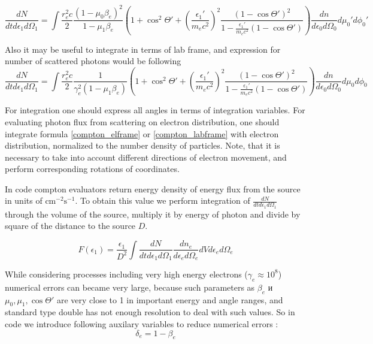 \begin{equation} \label{compton_elframe}
	\frac{dN}{dt d\epsilon_1 d\Omega_1}=\int \frac{r_e^2 c}{2} \frac{(1 - \mu_0 \beta_e)^2}{1-\mu_1\beta_e} \left(1 + \cos^2\Theta'+\left(\frac{\epsilon_1'}{m_e c^2}\right)^2\frac{(1-\cos\Theta')^2}{1-\frac{\epsilon_1'}{m_e c^2}(1 - \cos \Theta')}\right)\frac{dn}{d\epsilon_0 d\Omega_0}d\mu_0' d\phi_0'	
\end{equation}

Also it may be useful to integrate in terms of lab frame, and expression for number of scattered photons would be following
\begin{equation}\label{compton_labframe}
	\frac{dN}{dt d\epsilon_1 d\Omega_1}=\int \frac{r_e^2 c}{2} \frac{1}{\gamma_e^2(1-\mu_1\beta_e)} \left(1 + \cos^2\Theta'+\left(\frac{\epsilon_1'}{m_e c^2}\right)^2\frac{(1-\cos\Theta')^2}{1-\frac{\epsilon_1'}{m_e c^2}(1 - \cos \Theta')}\right)\frac{dn}{d\epsilon_0 d\Omega_0}d\mu_0 d\phi_0
\end{equation}

For integration one should express all angles in terms of integration variables. For evaluating photon flux from scattering on electron distribution, one should integrate formula \ref{compton_elframe} or \ref{compton_labframe} with electron distribution, normalized to the number density of particles. Note, that it is necessary to take into account different directions of electron movement, and perform corresponding rotations of coordinates.

In code compton evaluators return energy density of energy flux from the source in units of $\text{cm}^{-2} \text{s}^{-1}$. To obtain this value we perform integration of $\frac{dN}{dt d\epsilon_1 d\Omega_1}$ through the volume of the source, multiply it by energy of photon and divide by square of the distance to the source $D$.

\begin{equation}\label{comtonKlein}
	F(\epsilon_1)=\frac{\epsilon_1}{D^2}\int \frac{dN}{dt d\epsilon_1 d\Omega_1} \frac{dn_e}{d\epsilon_e d\Omega_e} dV d\epsilon_e d\Omega_e
\end{equation}

While considering processes including very high energy electrons ($\gamma_e \approx 10^8$) numerical errors can became very large, because such parameters as $\beta_e$ и $\mu_0, \mu_1, \cos \Theta'$ are very close to 1 in important energy and angle ranges, and standard type double has not enough resolution to deal with such values. So in code we introduce following auxilary variables to reduce numerical errors
:
\begin{equation}
	\delta_e = 1 - \beta_e
\end{equation}


